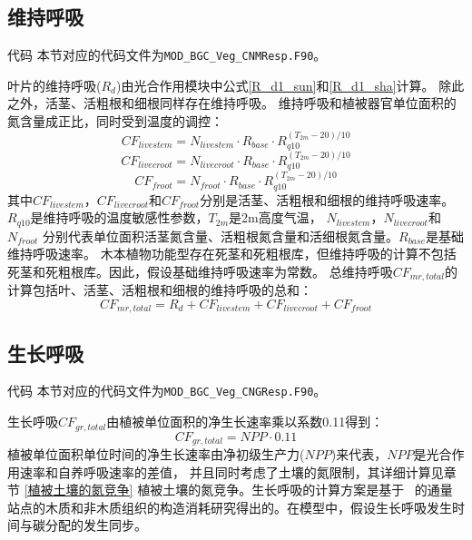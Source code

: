 \subsection{维持呼吸}
\begin{mymdframed}{代码}
本节对应的代码文件为\texttt{MOD\_BGC\_Veg\_CNMResp.F90}。
\end{mymdframed}
叶片的维持呼吸($R_d$)由光合作用模块中公式\eqref{R_d1_sun}和\eqref{R_d1_sha}计算。
除此之外，活茎、活粗根和细根同样存在维持呼吸。
维持呼吸和植被器官单位面积的氮含量成正比，同时受到温度的调控：
\begin{equation}
CF_{{livestem}}=N_{{livestem }} \cdot R_{{base }} \cdot R_{q10}^{\left(T_{2m}-20\right) / 10}
\end{equation}
\begin{equation}
CF_{ {livecroot }}=N_{ {livecroot }} \cdot R_{ {base }} \cdot R_{q10}^{\left(T_{2m}-20\right) / 10}
\end{equation}
\begin{equation}
CF_{ {froot }}=N_{{froot}} \cdot R_{{base}} \cdot R_{q10}^{\left(T_{2m}-20\right) / 10}
\end{equation}
其中$CF_{livestem}$，$CF_{livecroot}$和$CF_{froot}$分别是活茎、活粗根和细根的维持呼吸速率。
$R_{q10}$是维持呼吸的温度敏感性参数，$T_{2m}$是2m高度气温， $N_{livestem}$，$N_{livecroot}$和$N_{froot}$
分别代表单位面积活茎氮含量、活粗根氮含量和活细根氮含量。$R_{base}$是基础维持呼吸速率。
木本植物功能型存在死茎和死粗根库，但维持呼吸的计算不包括死茎和死粗根库。因此，假设基础维持呼吸速率为常数。
总维持呼吸$CF_{mr,total}$的计算包括叶、活茎、活粗根和细根的维持呼吸的总和：
\begin{equation}
CF_{mr,total}=R_{d}+CF_{livestem}+CF_{livecroot}+CF_{froot}
\end{equation}
\subsection{生长呼吸}\label{生长呼吸}
\begin{mymdframed}{代码}
本节对应的代码文件为\texttt{MOD\_BGC\_Veg\_CNGResp.F90}。
\end{mymdframed}
生长呼吸$CF_{gr,total}$由植被单位面积的净生长速率乘以系数0.11得到：
\begin{equation}
CF_{gr,total}=NPP \cdot 0.11
\end{equation}
植被单位面积单位时间的净生长速率由净初级生产力($NPP$)来代表，$NPP$是光合作用速率和自养呼吸速率的差值，
并且同时考虑了土壤的氮限制，其详细计算见章节 \ref{植被土壤的氮竞争} 植被土壤的氮竞争。生长呼吸的计算方案是基于~\citet{atkins2018quantifying}
的通量站点的木质和非木质组织的构造消耗研究得出的。在模型中，假设生长呼吸发生时间与碳分配的发生同步。


